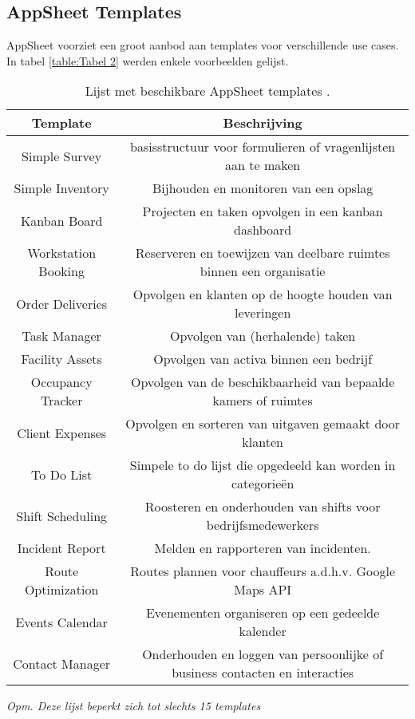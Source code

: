 \subsection{AppSheet Templates}


AppSheet voorziet een groot aanbod aan templates voor verschillende use cases. In tabel \ref{table:Tabel 2} werden enkele voorbeelden gelijst. 

\begin{table}[ht]
    \centering
    \caption{\label{tab:Tabel 2} Lijst met beschikbare AppSheet templates \autocite{AppSheetTemplates}.}
    \begin{tabular}{ | c | c | }
        \hline
        \textbf{Template} & \textbf{Beschrijving} \\
        \hline\hline
        Simple Survey & basisstructuur voor formulieren of vragenlijsten aan te maken \\
        Simple Inventory & Bijhouden en monitoren van een opslag \\
        Kanban Board & Projecten en taken opvolgen in een kanban dashboard \\
        Workstation Booking & Reserveren en toewijzen van deelbare ruimtes binnen een organisatie \\
        Order Deliveries & Opvolgen en klanten op de hoogte houden van leveringen \\
        Task Manager & Opvolgen van (herhalende) taken \\
        Facility Assets & Opvolgen van activa binnen een bedrijf \\
        Occupancy Tracker & Opvolgen van de beschikbaarheid van bepaalde kamers of ruimtes \\
        Client Expenses & Opvolgen en sorteren van uitgaven gemaakt door klanten \\
        To Do List & Simpele to do lijst die opgedeeld kan worden in categorieën \\
        Shift Scheduling & Roosteren en onderhouden van shifts voor bedrijfsmedewerkers \\
        Incident Report & Melden en rapporteren van incidenten. \\
        Route Optimization & Routes plannen voor chauffeurs a.d.h.v. Google Maps API \\
        Events Calendar &  Evenementen organiseren op een gedeelde kalender \\
        Contact Manager & Onderhouden en loggen van persoonlijke of business contacten en interacties \\
        \hline
    \end{tabular}
    {\raggedright \textit{Opm. Deze lijst beperkt zich tot slechts 15 templates} \par}
\end{table}

